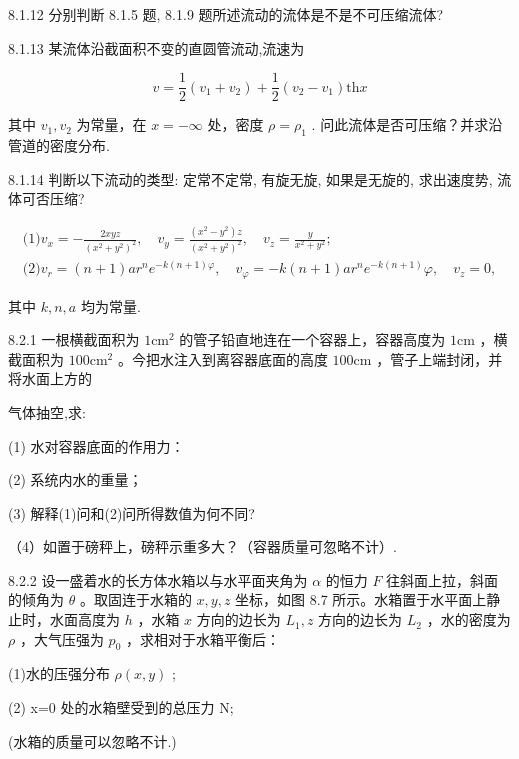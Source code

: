 \begin{problem}{8.1.12}
分别判断 8.1.5 题, 8.1.9 题所述流动的流体是不是不可压缩流体?
\end{problem}
\clearpage


\begin{problem}{8.1.13}
某流体沿截面积不变的直圆管流动,流速为

\[
v = \frac {1}{2} (v _ {1} + v _ {2}) + \frac {1}{2} (v _ {2} - v _ {1}) \mathrm{th} x
\]

其中 $v_{1}, v_{2}$ 为常量，在 $x = -\infty$ 处，密度 $\rho = \rho_{1}$ . 问此流体是否可压缩？并求沿管道的密度分布.
\end{problem}
\clearpage


\begin{problem}{8.1.14}
判断以下流动的类型: 定常不定常, 有旋无旋, 如果是无旋的, 求出速度势, 流体可否压缩?

\[
\begin{array}{l} \text {(1)} v _ {x} = - \frac {2 x y z}{(x ^ {2} + y ^ {2}) ^ {2}}, \quad v _ {y} = \frac {(x ^ {2} - y ^ {2}) z}{(x ^ {2} + y ^ {2}) ^ {2}}, \quad v _ {z} = \frac {y}{x ^ {2} + y ^ {2}}; \\ \text {(2)} v _ {r} = (n + 1) a r ^ {n} e ^ {- k (n + 1) \varphi}, \quad v _ {\varphi} = - k (n + 1) a r ^ {n} e ^ {- k (n + 1)} \varphi , \quad v _ {z} = 0, \end{array}
\]

其中 $k, n, a$ 均为常量.
\end{problem}
\clearpage


\begin{problem}{8.2.1}
一根横截面积为 $1\mathrm{cm}^2$ 的管子铅直地连在一个容器上，容器高度为 $1\mathrm{cm}$ ，横截面积为 $100\mathrm{cm}^2$ 。今把水注入到离容器底面的高度 $100\mathrm{cm}$ ，管子上端封闭，并将水面上方的

气体抽空,求:

(1) 水对容器底面的作用力：

(2) 系统内水的重量；

(3) 解释(1)问和(2)问所得数值为何不同?

（4）如置于磅秤上，磅秤示重多大？（容器质量可忽略不计）.
\end{problem}
\clearpage


\begin{problem}{8.2.2}
设一盛着水的长方体水箱以与水平面夹角为 $\alpha$ 的恒力 $F$ 往斜面上拉，斜面的倾角为 $\theta$ 。取固连于水箱的 $x, y, z$ 坐标，如图 8.7 所示。水箱置于水平面上静止时，水面高度为 $h$ ，水箱 $x$ 方向的边长为 $L_{1}, z$ 方向的边长为 $L_{2}$ ，水的密度为 $\rho$ ，大气压强为 $p_{0}$ ，求相对于水箱平衡后：

(1)水的压强分布 $\rho(x,y)$ ;

(2) x=0 处的水箱壁受到的总压力 N;

(水箱的质量可以忽略不计.)
\begin{center}

\end{center}
\end{problem}
\clearpage


